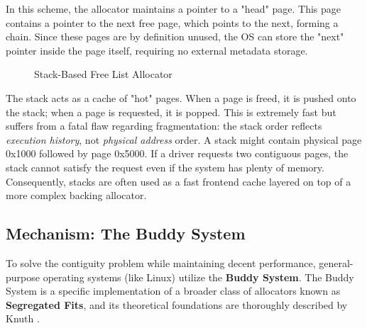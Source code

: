 \documentclass[a4paper,10pt,twoside]{report}
\theoremstyle{definition}
\begin{document}
In this scheme, the allocator maintains a pointer to a "head" page. This page contains a pointer to the next free page, which points to the next, forming a chain. Since these pages are by definition unused, the OS can store the "next" pointer inside the page itself, requiring no external metadata storage.

\begin{figure}[htbp]
\centering
{}
\caption{Stack-Based Free List Allocator}
\label{fig:stack_allocator}
\end{figure}

The stack acts as a cache of "hot" pages. When a page is freed, it is pushed onto the stack; when a page is requested, it is popped. This is extremely fast but suffers from a fatal flaw regarding fragmentation: the stack order reflects \textit{execution history}, not \textit{physical address} order. A stack might contain physical page 0x1000 followed by page 0x5000. If a driver requests two contiguous pages, the stack cannot satisfy the request even if the system has plenty of memory. Consequently, stacks are often used as a fast frontend cache layered on top of a more complex backing allocator.

\subsection{Mechanism: The Buddy System}

To solve the contiguity problem while maintaining decent performance, general-purpose operating systems (like Linux) utilize the \textbf{Buddy System}. The Buddy System is a specific implementation of a broader class of allocators known as \textbf{Segregated Fits}, and its theoretical foundations are thoroughly described by Knuth \cite[Section~2.5]{knuth1973art}.
\end{document}
